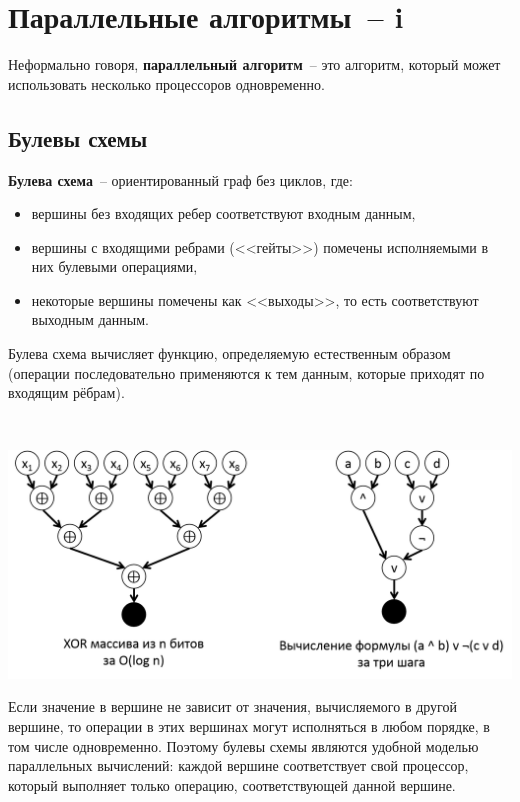 \section{Параллельные алгоритмы~-- i}

\secauthor{\denis}
Неформально говоря, {\bfseries параллельный алгоритм}~-- это алгоритм, который может использовать несколько процессоров одновременно.
\subsection{Булевы схемы}
\begin{definition*}
	{\bfseries Булева схема}~-- ориентированный граф без циклов, где:
\begin{itemize}
    \item вершины без входящих ребер соответствуют входным данным,
    \item вершины с входящими ребрами (<<гейты>>) помечены исполняемыми в них булевыми операциями,
    \item некоторые вершины помечены как <<выходы>>, то есть соответствуют выходным данным.
\end{itemize}
Булева схема вычисляет функцию, определяемую естественным образом (операции последовательно
применяются к тем данным, которые приходят по входящим рёбрам).
\end{definition*}
\begin{example*}
$ $
    \begin{center}
    \includegraphics[scale=0.5]{figures/boolex.png}
    \end{center}
\end{example*}

Если значение в вершине не зависит от значения, вычисляемого в другой вершине, то
операции в этих вершинах могут исполняться в любом порядке, в том числе одновременно.
Поэтому булевы схемы являются удобной моделью параллельных вычислений:
каждой вершине соответствует свой процессор, который выполняет только операцию, соответствующей данной вершине.

